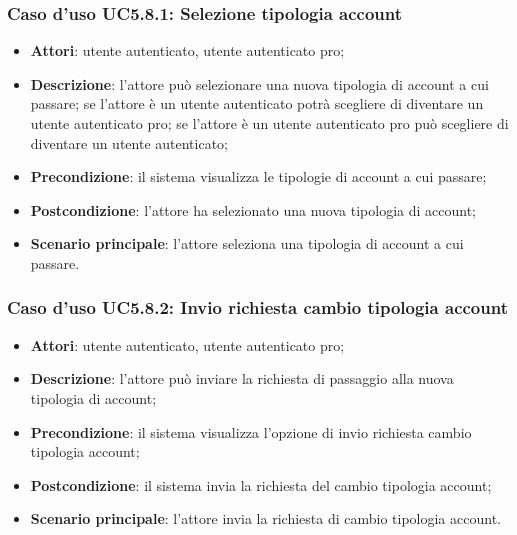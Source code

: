 \subsubsection{Caso d'uso UC5.8.1: Selezione tipologia account}

\begin{itemize}
	\item \textbf{Attori}: utente autenticato, utente autenticato pro;
	\item \textbf{Descrizione}: l'attore può selezionare una nuova tipologia di account a cui passare; se l'attore è un utente autenticato potrà scegliere di diventare un utente autenticato pro; se l'attore è un utente autenticato pro può scegliere di diventare un utente autenticato;
	\item \textbf{Precondizione}: il sistema visualizza le tipologie di account a cui passare;
	\item \textbf{Postcondizione}: l'attore ha selezionato  una nuova tipologia di account;
	\item \textbf{Scenario principale}: l'attore seleziona una tipologia di account a cui passare.
\end{itemize}

\subsubsection{Caso d'uso UC5.8.2: Invio richiesta cambio tipologia account}

\begin{itemize}
	\item \textbf{Attori}: utente autenticato, utente autenticato pro;
	\item \textbf{Descrizione}: l'attore può inviare la richiesta di passaggio alla nuova tipologia di account;
	\item \textbf{Precondizione}: il sistema visualizza l'opzione di invio richiesta cambio tipologia account;
	\item \textbf{Postcondizione}: il sistema invia la richiesta del cambio tipologia account;
	\item \textbf{Scenario principale}: l'attore invia la richiesta di cambio tipologia account.
\end{itemize}

